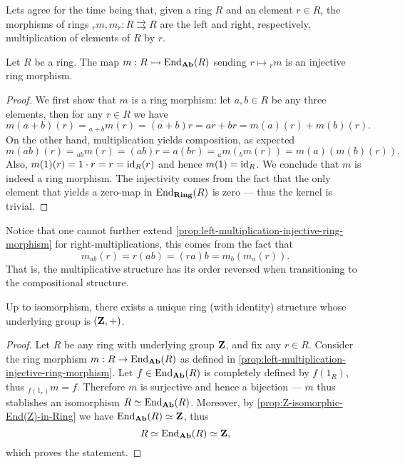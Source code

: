 Lets agree for the time being that, given a ring \(R\) and an element
\(r \in R\), the morphisms of rings \({}_rm, m_r: R \rightrightarrows R\) are
the left and right, respectively, multiplication of elements of \(R\) by \(r\).

%
\begin{proposition}
\label{prop:left-multiplication-injective-ring-morphism}
Let \(R\) be a ring. The map \(m: R \rightarrowtail \operatorname{End}_{{\textbf{Ab}}}(R)\) sending
\(r \mapsto {}_rm\) is an injective ring morphism.
\end{proposition}
%

%
\begin{proof}
We first show that \(m\) is a ring morphism: let \(a, b \in R\) be any three
elements, then for any \(r \in R\) we have
\[
m(a + b)(r) = {}_{a + b}m(r) = (a + b)r = a r + b r = m(a)(r) + m(b)(r).
\]
On the other hand, multiplication yields composition, as expected
\[
m(a b)(r) = {}_{a b}m(r) = (a b) r = a (b r) = {}_am({}_bm(r)) = m(a)(m(b)(r)).
\]
Also, \(m(1)(r) = 1 \cdot r = r = \operatorname{id}_R(r)\) and hence \(m(1) = \operatorname{id}_R\). We
conclude that \(m\) is indeed a ring morphism. The injectivity comes from the
fact that the only element that yields a zero-map in \(\operatorname{End}_{{\textbf{Ring}}}(R)\) is zero
--- thus the kernel is trivial.
\end{proof}
%

%
\begin{remark}
\label{rem:ring-right-multiplication-lacks-conditions}
Notice that one cannot further extend
\cref{prop:left-multiplication-injective-ring-morphism} for
right-multiplications, this comes from the fact that
\[
m_{a b}(r) = r (a b) = (r a) b = m_b(m_a(r)).
\]
That is, the multiplicative structure has its order reversed when transitioning
to the compositional structure.
\end{remark}
%

%
\begin{proposition}
\label{prop:unique-ring-structure-Z}
Up to isomorphism, there exists a unique ring (with identity) structure whose
underlying group is \((\mathbf{Z}, +)\).
\end{proposition}
%

%
\begin{proof}
Let \(R\) be any ring with underlying group \(\mathbf{Z}\), and fix any \(r \in
R\). Consider the ring morphism \(m: R \to \operatorname{End}_{{\textbf{Ab}}}(R)\) as defined in
\cref{prop:left-multiplication-injective-ring-morphism}. Let
\(f \in \operatorname{End}_{{\textbf{Ab}}}(R)\) is completely defined by \(f(1_R)\), thus
\({}_{f(1_r)}m = f\). Therefore \(m\) is surjective and hence a bijection ---
\(m\) thus stablishes an isomorphism \(R \simeq \operatorname{End}_{{\textbf{Ab}}}(R)\). Moreover, by
\cref{prop:Z-isomorphic-End(Z)-in-Ring} we have \(\operatorname{End}_{{\textbf{Ab}}}(R) \simeq \mathbf{Z}\), thus
\[
R \simeq \operatorname{End}_{{\textbf{Ab}}}(R) \simeq \mathbf{Z},
\]
which proves the statement.
\end{proof}
%


